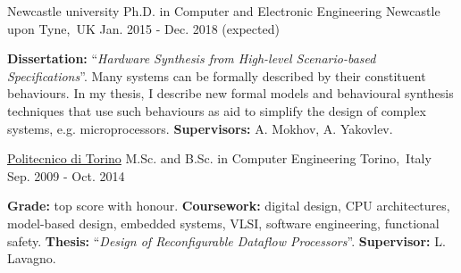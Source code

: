 
\begin{cventries}


\cventry
{Newcastle university} %
{Ph.D. in Computer and Electronic Engineering} %
{Newcastle upon Tyne,~UK} %
{Jan. 2015 - Dec. 2018 (expected)} %
{ %
\begin{cvitems}
\textbf{Dissertation:} ``\textit{Hardware Synthesis from High-level 
Scenario-based Specifications}''. Many systems can be formally described 
by their constituent behaviours. In my thesis, I describe new formal models and 
behavioural synthesis techniques that use such behaviours as aid to 
simplify the design of complex systems, e.g. microprocessors.
\textbf{Supervisors:} A. Mokhov, A. Yakovlev.
\end{cvitems}
}


\cventry
{\href{https://www.polito.it/?lang=en}{\color{myblue}Politecnico di Torino}}
{M.Sc. and B.Sc. in Computer Engineering}
{Torino,~Italy}
{Sep. 2009 - Oct. 2014}
{
\begin{cvitems}
\textbf{Grade:} top score with honour. \textbf{Coursework:} 
digital design, CPU architectures, model-based design, embedded systems, VLSI,
software engineering, functional safety. \textbf{Thesis:} 
``\emph{Design 
of Reconfigurable Dataflow Processors}''. \textbf{Supervisor:} L. Lavagno.
\end{cvitems}
}


\end{cventries}
\vspace{-2mm}